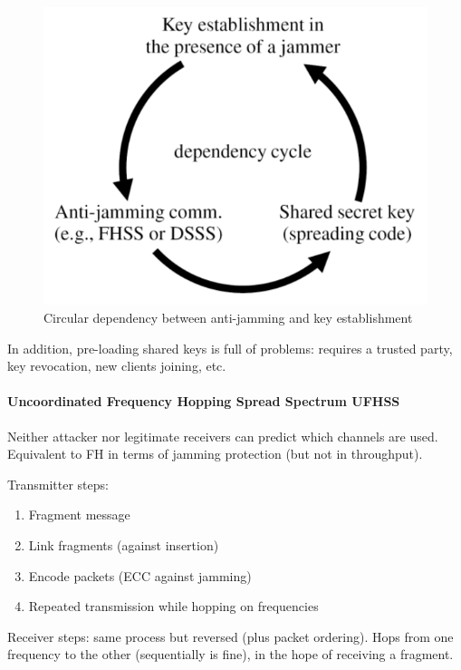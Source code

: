 \begin{figure}[h]
	\centering
	\includegraphics[scale=0.4]{images/3-jamming-key-cycle.png}
	\caption{Circular dependency between anti-jamming and key establishment}%
	\label{fig:jamming-key-cycle}
\end{figure}

In addition, pre-loading shared keys is full of problems:
requires a trusted party, key revocation, new clients joining, etc.

\paragraph{Uncoordinated Frequency Hopping Spread Spectrum UFHSS}
Neither attacker nor legitimate receivers can predict which channels are used.
Equivalent to FH in terms of jamming protection (but not in throughput).

Transmitter steps:
\begin{enumerate}
	\item Fragment message
	\item Link fragments (against insertion)
	\item Encode packets (ECC against jamming)
	\item Repeated transmission while hopping on frequencies
\end{enumerate}

Receiver steps: same process but reversed (plus packet ordering).
Hops from one frequency to the other (sequentially is fine), in the hope of receiving a fragment.

